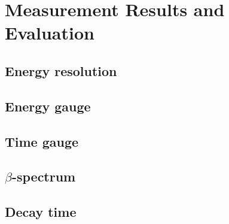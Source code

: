 \section{Measurement Results and Evaluation}
\subsection{Energy resolution}

\subsection{Energy gauge}

\subsection{Time gauge}

\subsection{$\beta$-spectrum}

\subsection{Decay time}
